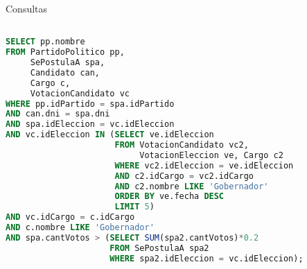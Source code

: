 \begin{section}{Consultas}
\begin{lstlisting}[language=SQL, basicstyle=\footnotesize]

SELECT pp.nombre
FROM PartidoPolitico pp, 
     SePostulaA spa, 
     Candidato can, 
     Cargo c, 
     VotacionCandidato vc
WHERE pp.idPartido = spa.idPartido
AND can.dni = spa.dni
AND spa.idEleccion = vc.idEleccion
AND vc.idEleccion IN (SELECT ve.idEleccion
                      FROM VotacionCandidato vc2, 
                           VotacionEleccion ve, Cargo c2
                      WHERE vc2.idEleccion = ve.idEleccion
                      AND c2.idCargo = vc2.idCargo
                      AND c2.nombre LIKE 'Gobernador'
                      ORDER BY ve.fecha DESC
                      LIMIT 5)
AND vc.idCargo = c.idCargo
AND c.nombre LIKE 'Gobernador'
AND spa.cantVotos > (SELECT SUM(spa2.cantVotos)*0.2
                     FROM SePostulaA spa2
                     WHERE spa2.idEleccion = vc.idEleccion);

\end{lstlisting} 


\end{section}
